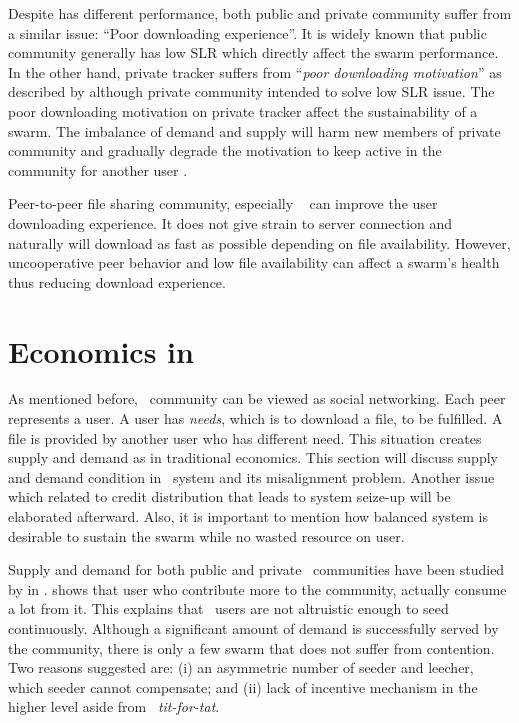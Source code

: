 Despite has different performance, both public and private community suffer from a similar issue: ``Poor downloading experience''. It is widely known that public community generally has low SLR which directly affect the swarm performance. In the other hand, private tracker suffers from ``\textit{poor downloading motivation}'' as described by \citeauthor{2014:sustainabilitytorrent:chen}\cite{2014:sustainabilitytorrent:chen} although private community intended to solve low SLR issue. The poor downloading motivation on private tracker affect the sustainability of a swarm. The imbalance of demand and supply will harm new members of private community and gradually degrade the motivation to keep active in the community for another user \cite{2014:sustainabilitytorrent:chen}.

Peer-to-peer file sharing community, especially \bt~ can improve the user downloading experience. It does not give strain to server connection and naturally will download as fast as possible depending on file availability. However, uncooperative peer behavior and low file availability can affect a swarm's health thus reducing download experience.

\section{Economics in \bt}
As mentioned before, \bt~community can be viewed as social networking. Each peer represents a user. A user has \textit{needs}, which is to download a file, to be fulfilled. A file is provided by another user who has different need. This situation creates supply and demand as in traditional economics. This section will discuss supply and demand condition in \bt~system and its misalignment problem. Another issue which related to credit distribution that leads to system seize-up will be elaborated afterward. Also, it is important to mention how balanced system is desirable to sustain the swarm while no wasted resource on user.

Supply and demand for both public and private \bt~communities have been studied by \citeauthor{2009:demandsupplyres:andrade} in \citeyear{2009:demandsupplyres:andrade}. \citeauthor{2009:demandsupplyres:andrade} shows that user who contribute more to the community, actually consume a lot from it. This explains that \bt~users are not altruistic enough to seed continuously. Although a significant amount of demand is successfully served by the community, there is only a few swarm that does not suffer from contention. Two reasons \citeauthor{2009:demandsupplyres:andrade} suggested are: (i) an asymmetric number of seeder and leecher, which seeder cannot compensate; and (ii) lack of incentive mechanism in the higher level aside from \bt~\textit{tit-for-tat}. 

